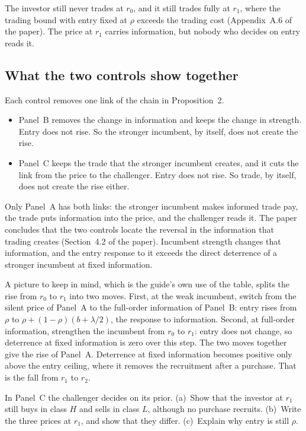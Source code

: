 The investor still never trades at \(r_0\), and it still trades fully at \(r_1\), where the trading bound with
entry fixed at \(\rho\) exceeds the trading cost (Appendix~A.6 of the paper). The price at \(r_1\) carries
information, but nobody who decides on entry reads it.

\subsection{What the two controls show together}

Each control removes one link of the chain in Proposition~2.
\begin{itemize}
\item Panel~B removes the change in information and keeps the change in strength. Entry does not rise. So the
  stronger incumbent, by itself, does not create the rise.
\item Panel~C keeps the trade that the stronger incumbent creates, and it cuts the link from the price to the
  challenger. Entry does not rise. So trade, by itself, does not create the rise either.
\end{itemize}
Only Panel~A has both links: the stronger incumbent makes informed trade pay, the trade puts information into the
price, and the challenger reads it. The paper concludes that the two controls locate the reversal in the information
that trading creates (Section~4.2 of the paper). Incumbent strength changes that information, and the entry response
to it exceeds the direct deterrence of a stronger incumbent at fixed information.

A picture to keep in mind, which is the guide's own use of the table, splits the rise from \(r_0\) to \(r_1\) into two
moves. First, at the weak incumbent, switch from the silent price of Panel~A to the full-order information of
Panel~B: entry rises from \(\rho\) to \(\rho+(1-\rho)(b+\lambda/2)\), the response to information. Second, at
full-order information, strengthen the incumbent from \(r_0\) to \(r_1\): entry does not change, so deterrence at
fixed information is zero over this step. The two moves together give the rise of Panel~A. Deterrence at fixed information becomes positive only above the
entry ceiling, where it removes the recruitment after a purchase. That is the fall from \(r_1\) to \(r_2\).

\begin{checkyourself}
\label{q:example-hidden}
In Panel~C the challenger decides on its prior.
(a)~Show that the investor at \(r_1\) still buys in class \(H\) and sells in class \(L\), although no purchase recruits.
(b)~Write the three prices at \(r_1\), and show that they differ.
(c)~Explain why entry is still \(\rho\).
\end{checkyourself}

